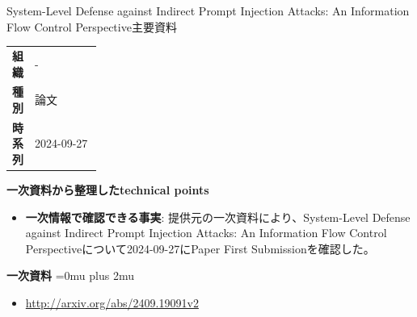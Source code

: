 \begin{technicalnote}{System-Level Defense against Indirect Prompt Injection Attacks: An Information Flow Control Perspective}{主要資料}
\begingroup
\begin{tabularx}{\linewidth}{@{}>{\bfseries}p{0.22\linewidth}X@{}}
組織 & - \\
種別 & 論文 \\
時系列 & 2024-09-27 \\
\end{tabularx}
\smallskip
{\bfseries 一次資料から整理したtechnical points}
\begin{itemize}[leftmargin=1.5em,itemsep=0.35em]
\item \textbf{一次情報で確認できる事実}: 提供元の一次資料により、System-Level Defense against Indirect Prompt Injection Attacks: An Information Flow Control Perspectiveについて2024-09-27にPaper First Submissionを確認した。
\end{itemize}
\begin{minipage}{\linewidth}
\begin{samepage}
{\bfseries 一次資料}
\begingroup\sloppy
\Urlmuskip=0mu plus 2mu\relax
\begin{itemize}[leftmargin=1.5em,itemsep=0.25em]
\item {\scriptsize\url{http://arxiv.org/abs/2409.19091v2}}
\end{itemize}
\endgroup
\end{samepage}
\end{minipage}
\endgroup
\end{technicalnote}
\medskip

